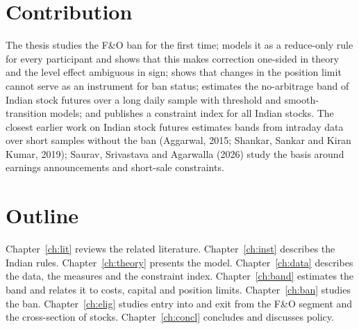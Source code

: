 \section{Contribution}
The thesis studies the F\&O ban for the first time; models it as a reduce-only rule for every participant and shows that
this makes correction one-sided in theory and the level effect ambiguous in sign; shows that changes in the position limit
cannot serve as an instrument for ban status; estimates the no-arbitrage band of Indian stock futures over a long daily
sample with threshold and smooth-transition models; and publishes a constraint index for all Indian stocks. The closest
earlier work on Indian stock futures estimates bands from intraday data over short samples without the ban (Aggarwal,
2015; Shankar, Sankar and Kiran Kumar, 2019); Saurav, Srivastava and Agarwalla (2026) study the basis around earnings
announcements and short-sale constraints.

\section{Outline}
Chapter~\ref{ch:lit} reviews the related literature. Chapter~\ref{ch:inst} describes the Indian rules. Chapter~\ref{ch:theory} presents the model. Chapter~\ref{ch:data}
describes the data, the measures and the constraint index. Chapter~\ref{ch:band} estimates the band and relates it to
costs, capital and position limits. Chapter~\ref{ch:ban} studies the ban. Chapter~\ref{ch:elig} studies entry into and exit
from the F\&O segment and the cross-section of stocks. Chapter~\ref{ch:concl} concludes and discusses policy.
